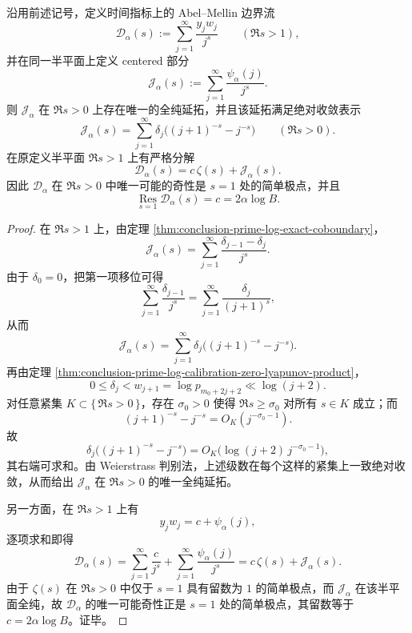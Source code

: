 \begin{theorem}\label{thm:conclusion-prime-log-abel-mellin-pole-rigidity}
沿用前述记号，定义时间指标上的 Abel--Mellin 边界流
\[
\mathcal D_\alpha(s):=
\sum_{j=1}^{\infty}\frac{y_jw_j}{j^s}
\qquad (\Re s>1),
\]
并在同一半平面上定义 centered 部分
\[
\mathcal J_\alpha(s):=
\sum_{j=1}^{\infty}\frac{\psi_\alpha(j)}{j^s}.
\]
则 \(\mathcal J_\alpha\) 在 \(\Re s>0\) 上存在唯一的全纯延拓，并且该延拓满足绝对收敛表示
\[
\mathcal J_\alpha(s)
=
\sum_{j=1}^{\infty}
\delta_j\bigl((j+1)^{-s}-j^{-s}\bigr)
\qquad (\Re s>0).
\]
在原定义半平面 \(\Re s>1\) 上有严格分解
\[
\mathcal D_\alpha(s)=c\,\zeta(s)+\mathcal J_\alpha(s).
\]
因此 \(\mathcal D_\alpha\) 在 \(\Re s>0\) 中唯一可能的奇性是 \(s=1\) 处的简单极点，并且
\[
\operatorname*{Res}_{s=1}\mathcal D_\alpha(s)=c=2\alpha\log B.
\]
\end{theorem}
\begin{proof}
在 \(\Re s>1\) 上，由定理 \ref{thm:conclusion-prime-log-exact-coboundary}，
\[
\mathcal J_\alpha(s)
=
\sum_{j=1}^{\infty}\frac{\delta_{j-1}-\delta_j}{j^s}.
\]
由于 \(\delta_0=0\)，把第一项移位可得
\[
\sum_{j=1}^{\infty}\frac{\delta_{j-1}}{j^s}
=
\sum_{j=1}^{\infty}\frac{\delta_j}{(j+1)^s},
\]
从而
\[
\mathcal J_\alpha(s)
=
\sum_{j=1}^{\infty}
\delta_j\bigl((j+1)^{-s}-j^{-s}\bigr).
\]
再由定理 \ref{thm:conclusion-prime-log-calibration-zero-lyapunov-product}，
\[
0\le \delta_j<w_{j+1}=\log p_{m_0+2j+2}\ll \log(j+2).
\]
对任意紧集 \(K\subset\{\,\Re s>0\,\}\)，存在 \(\sigma_0>0\) 使得 \(\Re s\ge \sigma_0\) 对所有 \(s\in K\) 成立；而
\[
(j+1)^{-s}-j^{-s}=O_K(j^{-\sigma_0-1}).
\]
故
\[
\delta_j\bigl((j+1)^{-s}-j^{-s}\bigr)
=
O_K\!\bigl(\log(j+2)\,j^{-\sigma_0-1}\bigr),
\]
其右端可求和。由 Weierstrass 判别法，上述级数在每个这样的紧集上一致绝对收敛，从而给出 \(\mathcal J_\alpha\) 在 \(\Re s>0\) 的唯一全纯延拓。

另一方面，在 \(\Re s>1\) 上有
\[
y_jw_j=c+\psi_\alpha(j),
\]
逐项求和即得
\[
\mathcal D_\alpha(s)
=
\sum_{j=1}^{\infty}\frac{c}{j^s}
+\sum_{j=1}^{\infty}\frac{\psi_\alpha(j)}{j^s}
=
c\,\zeta(s)+\mathcal J_\alpha(s).
\]
由于 \(\zeta(s)\) 在 \(\Re s>0\) 中仅于 \(s=1\) 具有留数为 \(1\) 的简单极点，而 \(\mathcal J_\alpha\) 在该半平面全纯，故 \(\mathcal D_\alpha\) 的唯一可能奇性正是 \(s=1\) 处的简单极点，其留数等于 \(c=2\alpha\log B\)。证毕。
\end{proof}

